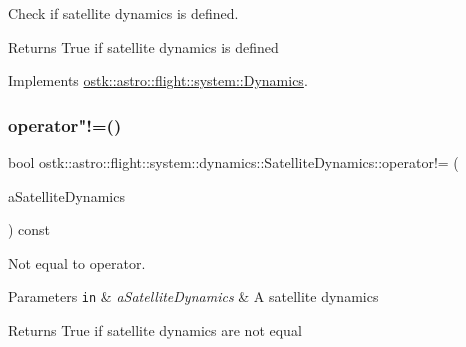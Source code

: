 Check if satellite dynamics is defined. 

\begin{DoxyReturn}{Returns}
True if satellite dynamics is defined 
\end{DoxyReturn}


Implements \hyperlink{classostk_1_1astro_1_1flight_1_1system_1_1_dynamics_a13160e001990a6ce8db807e39b8f97df}{ostk\+::astro\+::flight\+::system\+::\+Dynamics}.

\mbox{\label{classostk_1_1astro_1_1flight_1_1system_1_1dynamics_1_1_satellite_dynamics_a0f65a238480359b9baf68ea4b2155eda}} 
\subsubsection{\texorpdfstring{operator"!=()}{operator!=()}}
{\footnotesize\ttfamily bool ostk\+::astro\+::flight\+::system\+::dynamics\+::\+Satellite\+Dynamics\+::operator!= (\begin{DoxyParamCaption}\item[{const \hyperlink{classostk_1_1astro_1_1flight_1_1system_1_1dynamics_1_1_satellite_dynamics}{Satellite\+Dynamics} \&}]{a\+Satellite\+Dynamics }\end{DoxyParamCaption}) const}



Not equal to operator. 


\begin{DoxyParams}[1]{Parameters}
\mbox{\tt in}  & {\em a\+Satellite\+Dynamics} & A satellite dynamics \\
\hline
\end{DoxyParams}
\begin{DoxyReturn}{Returns}
True if satellite dynamics are not equal 
\end{DoxyReturn}
\mbox{\label{classostk_1_1astro_1_1flight_1_1system_1_1dynamics_1_1_satellite_dynamics_a911f594991ee3b3a9187a34904118fc6}} 
